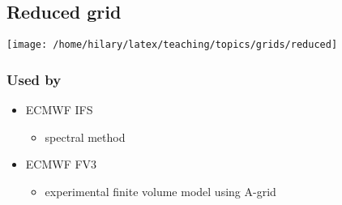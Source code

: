 \begin{minipage}[t]{0.48\columnwidth}%

\subsection{Reduced grid}

\texttt{[image: /home/hilary/latex/teaching/topics/grids/reduced]}%
\end{minipage} \hfill{}%
\begin{minipage}[t]{0.47\columnwidth}%

\subsubsection*{Used by}
\begin{itemize}
\item ECMWF IFS
\begin{itemize}
\item spectral method
\end{itemize}
\item ECMWF FV3
\begin{itemize}
\item experimental finite volume model using A-grid
\end{itemize}
\end{itemize}
%
\end{minipage}

\clearpage{}

